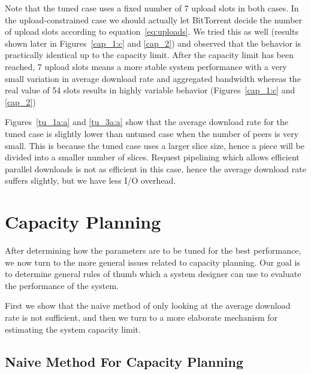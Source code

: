 \documentclass[10pt,letterpaper,twocolumn]{article}
\begin{document}
Note that the tuned case uses a fixed number of 7 upload slots in both
cases. In the upload-constrained case we should actually let
BitTorrent decide the number of upload slots according to
equation~\eqref{eq:uploads}. We tried this as well (results shown
later in Figures~\ref{cap_1:c} and \ref{cap_2}) and observed that the
behavior is practically identical up to the capacity limit. After the
capacity limit has been reached, 7 upload slots means a more stable
system performance with a very small variation in average download
rate and aggregated bandwidth whereas the real value of 54 slots
results in highly variable behavior (Figures~\ref{cap_1:c} and
\ref{cap_2})




Figures~\ref{tu_1a:a} and \ref{tu_3a:a} show that the average download
rate for the tuned case is slightly lower than untuned case when the
number of peers is very small. This is because the tuned case uses a
larger slice size, hence a piece will be divided into a smaller number
of slices. Request pipelining which allows efficient parallel
downloads is not as efficient in this case, hence the average download
rate suffers slightly, but we have less I/O overhead.






















\section{Capacity Planning}
\label{capacity_planning}

After determining how the parameters are to be tuned for the best
performance, we now turn to the more general issues related to
capacity planning. Our goal is to determine general rules of thumb
which a system designer can use to evaluate the performance of the
system. 



First we show that the naive method of only looking at the average
download rate is not sufficient, and then we turn to a more elaborate
mechanism for estimating the system capacity limit.



\subsection{Naive Method For Capacity Planning}
\label{sec:naive-meth-capac}
\end{document}
